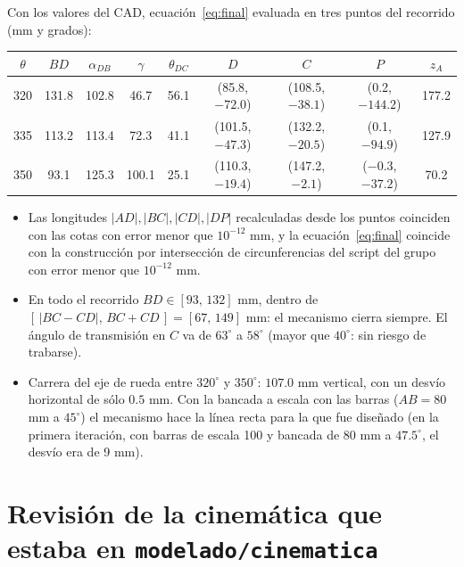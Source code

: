 \documentclass[11pt,a4paper]{article}
\begin{document}
Con los valores del CAD, ecuación~\eqref{eq:final} evaluada en tres puntos del recorrido (mm y grados):

\begin{center}
\small
\begin{tabular}{ccccccccc}
\toprule
\(\theta\) & \(BD\) & \(\alpha_{DB}\) & \(\gamma\) & \(\theta_{DC}\) & \(D\) & \(C\) & \(P\) & \(z_A\) \\
\midrule
320 & 131.8 & 102.8 & 46.7 & 56.1 & (85.8, \(-72.0\)) & (108.5, \(-38.1\)) & (0.2, \(-144.2\)) & 177.2 \\
335 & 113.2 & 113.4 & 72.3 & 41.1 & (101.5, \(-47.3\)) & (132.2, \(-20.5\)) & (0.1, \(-94.9\)) & 127.9 \\
350 & 93.1 & 125.3 & 100.1 & 25.1 & (110.3, \(-19.4\)) & (147.2, \(-2.1\)) & (\(-0.3\), \(-37.2\)) & 70.2 \\
\bottomrule
\end{tabular}
\end{center}

\begin{itemize}[nosep]
\item Las longitudes \(|AD|,|BC|,|CD|,|DP|\) recalculadas desde los puntos coinciden con las cotas con
error menor que \(10^{-12}\) mm, y la ecuación~\eqref{eq:final} coincide con la construcción por
intersección de circunferencias del script del grupo con error menor que \(10^{-12}\) mm.
\item En todo el recorrido \(BD\in[93,\,132]\) mm, dentro de \([\,|BC-CD|,\,BC+CD\,]=[67,\,149]\) mm:
el mecanismo cierra siempre. El ángulo de transmisión en \(C\) va de \(63^\circ\) a \(58^\circ\)
(mayor que \(40^\circ\): sin riesgo de trabarse).
\item Carrera del eje de rueda entre \(320^\circ\) y \(350^\circ\): \(107.0\) mm vertical, con un desvío
horizontal de sólo \(0.5\) mm. Con la bancada a escala con las barras (\(AB=80\) mm a \(45^\circ\)) el mecanismo
hace la línea recta para la que fue diseñado (en la primera iteración, con barras de escala 100 y bancada de
80 mm a \(47.5^\circ\), el desvío era de 9 mm).
\end{itemize}

\section{Revisión de la cinemática que estaba en \texttt{modelado/cinematica}}
\end{document}
